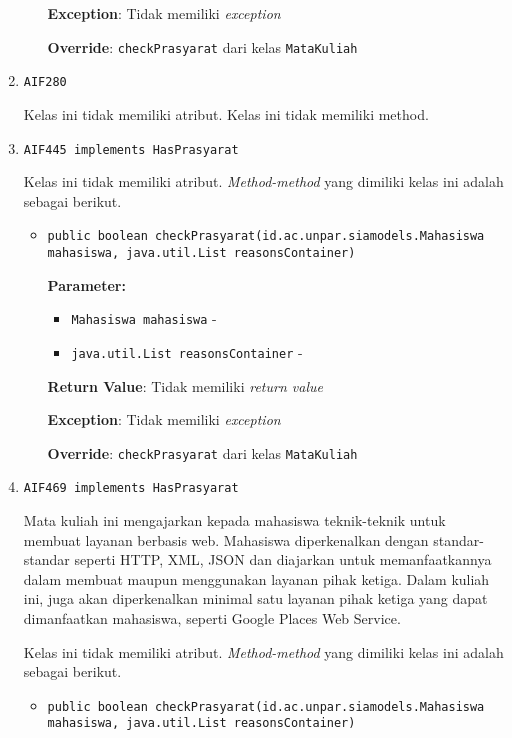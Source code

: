 \documentclass{article}
\begin{document}
\begin{enumerate}
\begin{itemize}
\textbf{Exception}: Tidak memiliki \textit{exception}

\textbf{Override}: \texttt{checkPrasyarat} dari kelas \texttt{MataKuliah}

\end{itemize}
\item \texttt{AIF280}



Kelas ini tidak memiliki atribut. Kelas ini tidak memiliki method. \item \texttt{AIF445 implements HasPrasyarat}



Kelas ini tidak memiliki atribut. \textit{Method-method} yang dimiliki kelas ini adalah sebagai berikut.
\begin{itemize}
\item \texttt{public boolean checkPrasyarat(id.ac.unpar.siamodels.Mahasiswa mahasiswa, java.util.List reasonsContainer)}



\textbf{Parameter:}
\begin{itemize}
\item \texttt{Mahasiswa mahasiswa} - 
\item \texttt{java.util.List reasonsContainer} - 
\end{itemize}
\textbf{Return Value}: Tidak memiliki \textit{return value}

\textbf{Exception}: Tidak memiliki \textit{exception}

\textbf{Override}: \texttt{checkPrasyarat} dari kelas \texttt{MataKuliah}

\end{itemize}
\item \texttt{AIF469 implements HasPrasyarat}

Mata kuliah ini mengajarkan kepada mahasiswa teknik-teknik untuk membuat 
 layanan berbasis web. Mahasiswa diperkenalkan dengan standar-standar seperti 
 HTTP, XML, JSON dan diajarkan untuk memanfaatkannya dalam membuat maupun 
 menggunakan layanan pihak ketiga. Dalam kuliah ini, juga akan diperkenalkan 
 minimal satu layanan pihak ketiga yang dapat dimanfaatkan mahasiswa, seperti 
 Google Places Web Service.

Kelas ini tidak memiliki atribut. \textit{Method-method} yang dimiliki kelas ini adalah sebagai berikut.
\begin{itemize}
\item \texttt{public boolean checkPrasyarat(id.ac.unpar.siamodels.Mahasiswa mahasiswa, java.util.List reasonsContainer)}




\end{itemize}
\end{enumerate}
\end{document}
